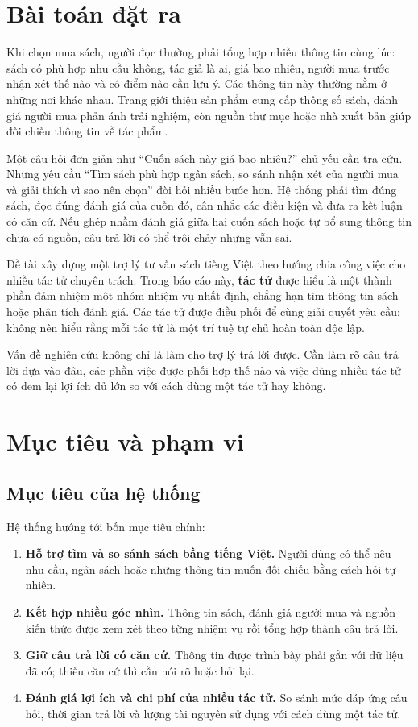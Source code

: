 \section{Bài toán đặt ra}

Khi chọn mua sách, người đọc thường phải tổng hợp nhiều thông tin cùng lúc: sách có phù hợp nhu cầu không, tác giả là ai, giá bao nhiêu, người mua trước nhận xét thế nào và có điểm nào cần lưu ý. Các thông tin này thường nằm ở những nơi khác nhau. Trang giới thiệu sản phẩm cung cấp thông số sách, đánh giá người mua phản ánh trải nghiệm, còn nguồn thư mục hoặc nhà xuất bản giúp đối chiếu thông tin về tác phẩm.

Một câu hỏi đơn giản như ``Cuốn sách này giá bao nhiêu?'' chủ yếu cần tra cứu. Nhưng yêu cầu ``Tìm sách phù hợp ngân sách, so sánh nhận xét của người mua và giải thích vì sao nên chọn'' đòi hỏi nhiều bước hơn. Hệ thống phải tìm đúng sách, đọc đúng đánh giá của cuốn đó, cân nhắc các điều kiện và đưa ra kết luận có căn cứ. Nếu ghép nhầm đánh giá giữa hai cuốn sách hoặc tự bổ sung thông tin chưa có nguồn, câu trả lời có thể trôi chảy nhưng vẫn sai.

Đề tài xây dựng một trợ lý tư vấn sách tiếng Việt theo hướng chia công việc cho nhiều tác tử chuyên trách. Trong báo cáo này, \textbf{tác tử} được hiểu là một thành phần đảm nhiệm một nhóm nhiệm vụ nhất định, chẳng hạn tìm thông tin sách hoặc phân tích đánh giá. Các tác tử được điều phối để cùng giải quyết yêu cầu; không nên hiểu rằng mỗi tác tử là một trí tuệ tự chủ hoàn toàn độc lập.

Vấn đề nghiên cứu không chỉ là làm cho trợ lý trả lời được. Cần làm rõ câu trả lời dựa vào đâu, các phần việc được phối hợp thế nào và việc dùng nhiều tác tử có đem lại lợi ích đủ lớn so với cách dùng một tác tử hay không.

\section{Mục tiêu và phạm vi}

\subsection{Mục tiêu của hệ thống}
Hệ thống hướng tới bốn mục tiêu chính:
\begin{enumerate}
\item \textbf{Hỗ trợ tìm và so sánh sách bằng tiếng Việt.} Người dùng có thể nêu nhu cầu, ngân sách hoặc những thông tin muốn đối chiếu bằng cách hỏi tự nhiên.
\item \textbf{Kết hợp nhiều góc nhìn.} Thông tin sách, đánh giá người mua và nguồn kiến thức được xem xét theo từng nhiệm vụ rồi tổng hợp thành câu trả lời.
\item \textbf{Giữ câu trả lời có căn cứ.} Thông tin được trình bày phải gắn với dữ liệu đã có; thiếu căn cứ thì cần nói rõ hoặc hỏi lại.
\item \textbf{Đánh giá lợi ích và chi phí của nhiều tác tử.} So sánh mức đáp ứng câu hỏi, thời gian trả lời và lượng tài nguyên sử dụng với cách dùng một tác tử.
\end{enumerate}

